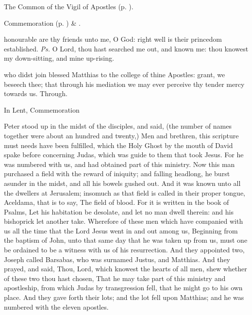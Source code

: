 \label{MatthiasVigil}

\begin{rubric}
	The Common of the Vigil of Apostles (p. \pageref{CommonVigilApostles}).
\end{rubric}
\begin{rubric}
	Commemoration  (p. \pageref{SPSaints}) \& .
\end{rubric}


\clearpage
{}

\introit
{} honourable are thy friends unto me, O God: right well is their princedom established. \textit{Ps.} O Lord, thou hast searched me out, and known me: thou knowest my down-sitting, and mine up-rising.

\collect
{} who didst join blessed Matthias to the college of thine Apostles: grant, we beseech thee; that through his mediation we may ever perceive thy tender mercy towards us. Through.
\begin{rubric}
    In Lent, Commemoration %
\end{rubric}

 Peter stood up in the midst of the disciples, and said, (the number of names together were about an hundred and twenty,) Men and brethren, this scripture must needs have been fulfilled, which the Holy Ghost by the mouth of David spake before concerning Judas, which was guide to them that took Jesus. For he was numbered with us, and had obtained part of this ministry. Now this man purchased a field with the reward of iniquity; and falling headlong, he burst asunder in the midst, and all his bowels gushed out. And it was known unto all the dwellers at Jerusalem; insomuch as that field is called in their proper tongue, Aceldama, that is to say, The field of blood. For it is written in the book of Psalms, Let his habitation be desolate, and let no man dwell therein: and his bishoprick let another take. Wherefore of these men which have companied with us all the time that the Lord Jesus went in and out among us, Beginning from the baptism of John, unto that same day that he was taken up from us, must one be ordained to be a witness with us of his resurrection. And they appointed two, Joseph called Barsabas, who was surnamed Justus, and Matthias. And they prayed, and said, Thou, Lord, which knowest the hearts of all men, shew whether of these two thou hast chosen, That he may take part of this ministry and apostleship, from which Judas by transgression fell, that he might go to his own place. And they gave forth their lots; and the lot fell upon Matthias; and he was numbered with the eleven apostles.

